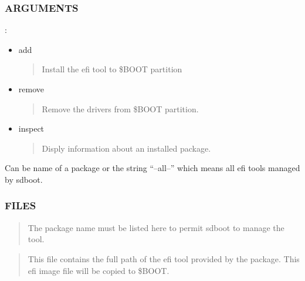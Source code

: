 \documentclass[letterpaper,11pt,english]{sphinxmanual}
\begin{document}
\subsubsection{ARGUMENTS}
\label{\detokenize{_build/man-ready/sd-boot-efi-tool-update.8:arguments}}
\sphinxAtStartPar
{}:
\begin{itemize}
\item {} 
\sphinxAtStartPar
add
\begin{quote}

\sphinxAtStartPar
Install the efi tool to \$BOOT partition
\end{quote}

\item {} 
\sphinxAtStartPar
remove
\begin{quote}

\sphinxAtStartPar
Remove the drivers from \$BOOT partition.
\end{quote}

\item {} 
\sphinxAtStartPar
inspect
\begin{quote}

\sphinxAtStartPar
Disply information about an installed package.
\end{quote}

\end{itemize}

\sphinxAtStartPar
{}

\sphinxAtStartPar
Can be name of a package or the string “–all–” which means all efi tools managed by sd\sphinxhyphen{}boot.


\subsubsection{FILES}
\label{\detokenize{_build/man-ready/sd-boot-efi-tool-update.8:files}}
\sphinxAtStartPar
{}
\begin{quote}

\sphinxAtStartPar
The package name must be listed here to permit sd\sphinxhyphen{}boot to manage the tool.
\end{quote}

\sphinxAtStartPar
{}
\begin{quote}

\sphinxAtStartPar
This file contains the full path of the efi tool provided by the package. This efi image
file will be copied to \$BOOT.
\end{quote}
\end{document}

